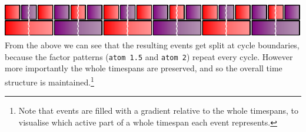 \begin{Shaded}
\begin{Highlighting}[]
\OtherTok{{-}\textgreater{}} \OtherTok{{-}\textgreater{}} \OtherTok{{-}\textgreater{}}
\NormalTok{  (}\OtherTok{{-}\textgreater{}} \OtherTok{{-}\textgreater{}} 
\OtherTok{=}\OtherTok{{-}\textgreater{}}

   \OtherTok{{-}\textgreater{}} \OtherTok{{-}\textgreater{}} 
\OtherTok{=}
\OtherTok{=}
\OtherTok{=}
\OtherTok{=}
\end{Highlighting}
\end{Shaded}

\begin{Shaded}
\begin{Highlighting}[]
\OtherTok{=}\NormalTok{ stack [fast (atom }
\NormalTok{             ]}
    \OtherTok{=}
\end{Highlighting}
\end{Shaded}

\includegraphics{../figures/fig5.pdf}\\

From the above we can see that the resulting events get split at cycle
boundaries, because the factor patterns (\texttt{atom\ 1.5} and
\texttt{atom\ 2}) repeat every cycle. However more importantly the whole
timespans are preserved, and so the overall time structure is
maintained.\footnote{Note that events are filled with a gradient
  relative to the whole timespans, to visualise which active part of a
  whole timespan each event represents.}

